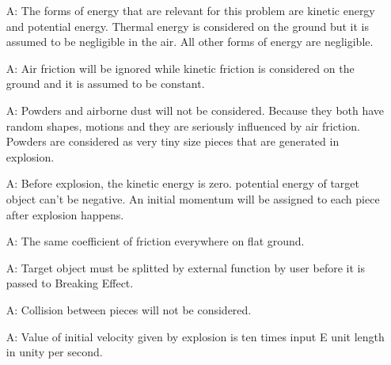 \documentclass[12pt]{article}
\newcounter{assumpnum} %
\begin{document}
	\begin{itemize}
		
		\item[A\refstepcounter{assumpnum}\theassumpnum \label{A_mechanical}:]
		The forms of energy that are relevant for this problem are kinetic energy and potential energy. Thermal energy is considered on the ground but it is assumed to be negligible in the air. All other forms of energy are negligible. 
		
		\item[A\refstepcounter{assumpnum}\theassumpnum \label{A_airFriction}:]
		Air friction will be ignored while kinetic friction is considered on the ground and it is assumed to be constant.
		
		\item[A\refstepcounter{assumpnum}\theassumpnum \label{A_powder}:]
		Powders and airborne  dust will not be considered. Because they both have random shapes, motions and they are seriously influenced by air friction. Powders are considered as very tiny size pieces that are generated in explosion.
		 
		
		\item[A\refstepcounter{assumpnum}\theassumpnum \label{A_initialPE}:]
	Before explosion, the kinetic energy is zero. potential energy of target object can't be negative. An initial momentum will be assigned to each piece after explosion happens. 
		
		\item[A\refstepcounter{assumpnum}\theassumpnum \label{A_ground}:]
		The same coefficient of friction everywhere on flat ground.​
		
		\item[A\refstepcounter{assumpnum}\theassumpnum \label{A_piece}:]
		Target object must be splitted by external function by user before it is passed to Breaking Effect. 
		
		\item[A\refstepcounter{assumpnum}\theassumpnum \label{A_collision}:]
		Collision between pieces will not be considered. 
		
		\item[A\refstepcounter{assumpnum}\theassumpnum \label{A_velocity}:]
		Value of initial velocity given by explosion is ten times input E unit length in unity per second.
	\end{itemize}
	
\end{document}
